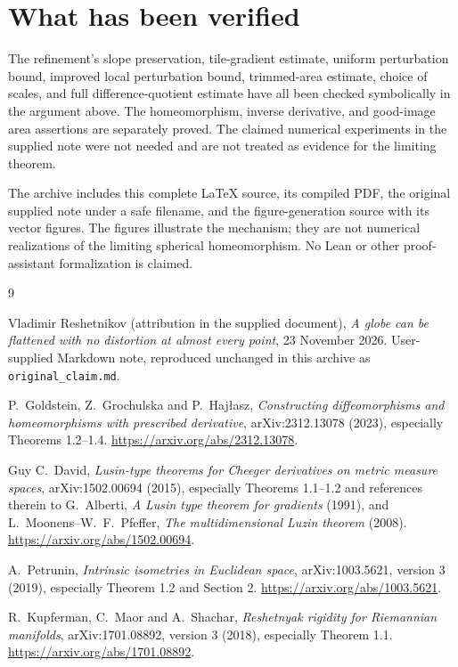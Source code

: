\documentclass[11pt,letterpaper]{article}
\numberwithin{equation}{section}
\theoremstyle{remark}
\begin{document}
\section{What has been verified}

The refinement's slope preservation, tile-gradient estimate, uniform perturbation bound, improved local perturbation bound, trimmed-area estimate, choice of scales, and full difference-quotient estimate have all been checked symbolically in the argument above. The homeomorphism, inverse derivative, and good-image area assertions are separately proved. The claimed numerical experiments in the supplied note were not needed and are not treated as evidence for the limiting theorem.

The archive includes this complete LaTeX source, its compiled PDF, the original supplied note under a safe filename, and the figure-generation source with its vector figures. The figures illustrate the mechanism; they are not numerical realizations of the limiting spherical homeomorphism. No Lean or other proof-assistant formalization is claimed.

\begin{thebibliography}{9}

Vladimir Reshetnikov (attribution in the supplied document),
\emph{A globe can be flattened with no distortion at almost every point},
23 November 2026. User-supplied Markdown note, reproduced unchanged in this archive as \texttt{original\_claim.md}.

P.~Goldstein, Z.~Grochulska and P.~Haj\l asz,
\emph{Constructing diffeomorphisms and homeomorphisms with prescribed derivative},
arXiv:2312.13078 (2023), especially Theorems 1.2--1.4.
\url{https://arxiv.org/abs/2312.13078}.

Guy C.~David,
\emph{Lusin-type theorems for Cheeger derivatives on metric measure spaces},
arXiv:1502.00694 (2015), especially Theorems 1.1--1.2 and references therein to G.~Alberti, \emph{A Lusin type theorem for gradients} (1991), and L.~Moonens--W.~F.~Pfeffer, \emph{The multidimensional Luzin theorem} (2008).
\url{https://arxiv.org/abs/1502.00694}.

A.~Petrunin,
\emph{Intrinsic isometries in Euclidean space},
arXiv:1003.5621, version 3 (2019), especially Theorem 1.2 and Section 2.
\url{https://arxiv.org/abs/1003.5621}.

R.~Kupferman, C.~Maor and A.~Shachar,
\emph{Reshetnyak rigidity for Riemannian manifolds},
arXiv:1701.08892, version 3 (2018), especially Theorem 1.1.
\url{https://arxiv.org/abs/1701.08892}.

\end{thebibliography}
\end{document}
